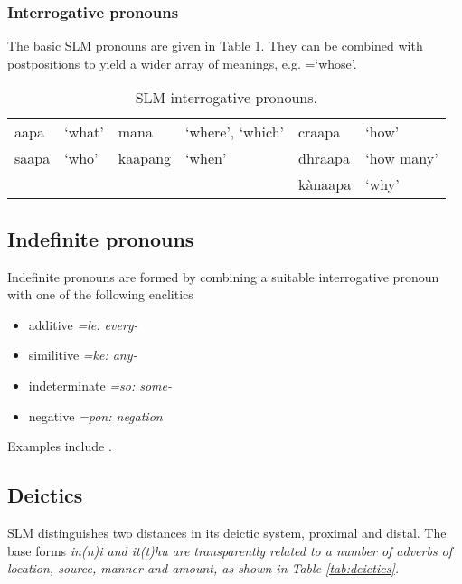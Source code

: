 
\subsubsection{Interrogative pronouns}\label{sec:interrogativepronouns}
The basic SLM pronouns are given in Table \ref{tab:interrogativepronouns}. They can be combined with postpositions to yield a wider array of meanings, e.g. =`whose'.

\begin{table}[p]
\begin{center}
 \begin{tabular}{llllll}
  aapa    & `what' & mana   & `where', `which' &      craapa  & `how'  \\
  saapa   & `who'  & kaapang & `when'         &      dhraapa & `how many' \\ 
          &      &         &              &      kànaapa & `why' \\
 \end{tabular}
\end{center}
\caption{SLM interrogative pronouns.}
\label{tab:interrogativepronouns}
\end{table}

\subsection{Indefinite pronouns}
Indefinite pronouns are formed by combining a suitable interrogative pronoun with one of the following enclitics

\begin{itemize}
 \item additive \em =le\em: every- %
 \item similitive \em =ke\em: any- %
 \item indeterminate \em =so\em: some- %
 \item negative \em =pon\em: negation%
\end{itemize}

Examples include 
.


\subsection{Deictics}
SLM distinguishes two distances in its deictic system, proximal and distal. The base forms \em in(n)i \em and \em it(t)hu \em are transparently related to a number of adverbs of location, source, manner and amount, as shown in Table \ref{tab:deictics}.


